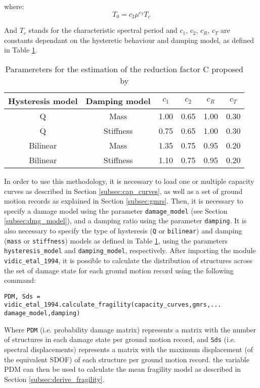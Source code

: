 where: 
\begin{equation}
T_0 = c_2\mu^{c_T}T_c
\end{equation} 

And $T_c$ stands for the characteristic spectral period and $c_1$, $c_2$, $c_R$, $c_T$ are constants dependant on the hysteretic behaviour and damping model, as defined in Table \ref{table:VidicEtAl}.

\begin {table}
\caption{Paramereters for the estimation of the reduction factor C proposed by \citep{VidicEtAl1994}} 
\label{table:VidicEtAl} 
\begin{center}
  \begin{tabular}{ | c | c | c | c | c | c |}
    \hline
    Hysteresis model & Damping model & $c_1$ & $c_2$ & $c_R$ & $c_T$ \\ \hline
    Q & Mass & 1.00 & 0.65 & 1.00 & 0.30 \\ \hline
    Q & Stiffness & 0.75 & 0.65 & 1.00 & 0.30 \\ \hline
    Bilinear & Mass & 1.35 & 0.75 & 0.95 & 0.20 \\ \hline
    Bilinear & Stiffness & 1.10 & 0.75 & 0.95 & 0.20 \\ \hline
  \end{tabular}
\end{center}
\end{table}

In order to use this methodology, it is necessary to load one or multiple capacity curves as described in Section \ref{subsec:cap_curves}, as well as a set of ground motion records as explained in Section \ref{subsec:gmrs}. Then, it is necessary to specify a damage model using the parameter \verb=damage_model= (see Section \ref{subsec:dmg_model}), and a damping ratio using the parameter \verb=damping=. It is also necessary to specify the type of hysteresis (\verb=Q= or \verb=bilinear=) and damping (\verb=mass= or \verb=stiffness=) models as defined in Table \ref{table:VidicEtAl}, using the parameters \verb=hysteresis_model= and \verb=damping_model=, respectively. After importing the module \verb=vidic_etal_1994=, it is possible to calculate the distribution of structures across the set of damage state for each ground motion record using the following command:

\begin{Verbatim}[frame=single, commandchars=\\\{\}, samepage=true]
PDM, Sds = vidic_etal_1994.calculate_fragility(capacity_curves,gmrs,...
damage_model,damping)
\end{Verbatim}

Where \verb=PDM= (i.e. probability damage matrix) represents a matrix with the number of structures in each damage state per ground motion record, and \verb=Sds= (i.e. spectral displacements) represents a matrix with the maximum displacement (of the equivalent SDOF) of each structure per ground motion record. the variable PDM can then be used to calculate the mean fragility model as described in Section \ref{subsec:derive_fragility}.




